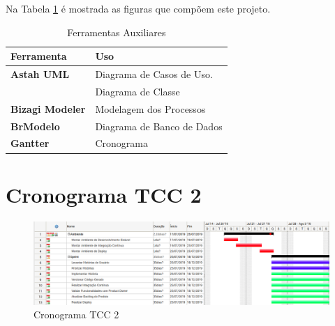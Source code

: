 Na Tabela \ref{tab:ferramentas_auxiliares} é mostrada as figuras que compõem este projeto.

\begin{table}[H]
	\begin{tabular}{|p{5.0cm}|p{10.0cm}|} 
	\hline
	\textbf{Ferramenta} & \textbf{Uso} \\ \hline
	\textbf{Astah UML} & Diagrama de Casos de Uso. \\ \hline
	& Diagrama de Classe \\ \hline
	\textbf{Bizagi Modeler} & Modelagem dos Processos \\ \hline
	\textbf{BrModelo} & Diagrama de Banco de Dados \\ \hline
	\textbf{Gantter} & Cronograma \\ \hline
	\end{tabular}
	 \caption{Ferramentas Auxiliares}
	 \label{tab:ferramentas_auxiliares}
\end{table}

\section{Cronograma TCC 2}

\begin{figure}[H]
	\centering
	\includegraphics[width=1.1\textwidth]{figuras/cronograma.png}
	\caption{Cronograma TCC 2}
	\label{img:cronograma}
\end{figure}